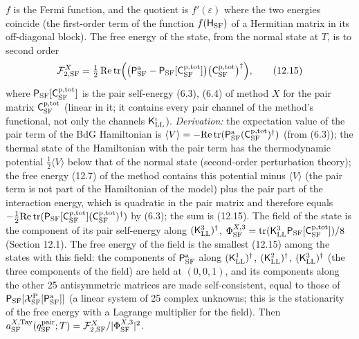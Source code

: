 \documentclass[
  10pt,
]{article}
\begin{document}
\(f\) is the Fermi function, and the quotient is \(f'(\varepsilon)\)
where the two energies coincide (the first-order term of the function
\(f(\mathsf H_{\rm SF})\) of a Hermitian matrix in its off-diagonal
block). The free energy of the state, from the normal state at \(T\), is
to second order
\[\mathcal F^X_{2,{\rm SF}}=\tfrac12\,\mathrm{Re}\,\mathrm{tr}\Big(\big(\mathsf P^{\rm a}_{\rm SF}-\mathsf P_{\rm SF}[\mathsf C^{\rm p,tot}_{\rm SF}]\big)\big(\mathsf C^{\rm p,tot}_{\rm SF}\big)^\dagger\Big),\tag{12.15}\]
where \(\mathsf P_{\rm SF}[\mathsf C^{\rm p,tot}_{\rm SF}]\) is the pair
self-energy (6.3), (6.4) of method \(X\) for the pair matrix
\(\mathsf C^{\rm p,tot}_{\rm SF}\) (linear in it; it contains every pair
channel of the method's functional, not only the channels
\(\mathsf K^\iota_{\rm LL}\)). \emph{Derivation:} the expectation value
of the pair term of the BdG Hamiltonian is
\(\langle V\rangle=-\mathrm{Re}\,\mathrm{tr}(\mathsf P^{\rm a}_{\rm SF}(\mathsf C^{\rm p,tot}_{\rm SF})^\dagger)\)
(from (6.3)); the thermal state of the Hamiltonian with the pair term
has the thermodynamic potential \(\tfrac12\langle V\rangle\) below that
of the normal state (second-order perturbation theory); the free energy
(12.7) of the method contains this potential minus \(\langle V\rangle\)
(the pair term is not part of the Hamiltonian of the model) plus the
pair part of the interaction energy, which is quadratic in the pair
matrix and therefore equals
\(-\tfrac12\mathrm{Re}\,\mathrm{tr}(\mathsf P_{\rm SF}[\mathsf C^{\rm p,tot}_{\rm SF}](\mathsf C^{\rm p,tot}_{\rm SF})^\dagger)\)
by (6.3); the sum is (12.15). The field of the state is the component of
its pair self-energy along \((\mathsf K^3_{\rm LL})^\dagger\),
\(\Phi^{X,3}_{\rm SF}=\mathrm{tr}(\mathsf K^3_{\rm LL}\mathsf P_{\rm SF}[\mathsf C^{\rm p,tot}_{\rm SF}])/8\)
(Section 12.1). The free energy of the field is the smallest (12.15)
among the states with this field: the components of
\(\mathsf P^{\rm a}_{\rm SF}\) along \((\mathsf K^1_{\rm LL})^\dagger\),
\((\mathsf K^2_{\rm LL})^\dagger\), \((\mathsf K^3_{\rm LL})^\dagger\)
(the three components of the field) are held at \((0,0,1)\), and its
components along the other 25 antisymmetric matrices are made
self-consistent, equal to those of
\(\mathsf P_{\rm SF}[\mathcal X^{\rm P}_{\rm SF}[\mathsf P^{\rm a}_{\rm SF}]]\)
(a linear system of 25 complex unknowns; this is the stationarity of the
free energy with a Lagrange multiplier for the field). Then
\(a^{X,{\rm Tay}}_{\rm SF}(q^{\rm pair}_{\rm SF};T)=\mathcal F^X_{2,{\rm SF}}/\lvert\Phi^{X,3}_{\rm SF}\rvert^2\).
\end{document}
